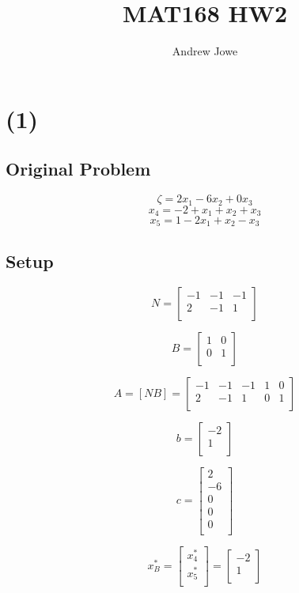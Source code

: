 \documentclass[14pt]{extarticle}
\title{MAT168 HW2}
\author{Andrew Jowe}
\begin{document}
\maketitle

\section*{(1)}
\subsection*{Original Problem}
\[
    \zeta = 2x_1 - 6x_2 + 0x_3
\]
\[
    x_4 = -2 + x_1 + x_2 + x_3
\]
\[
    x_5 = 1 - 2x_1 + x_2 - x_3
\]

\subsection*{Setup}
\[
    N=\begin{bmatrix}
        -1 & -1 & -1 \\
        2 & -1 & 1 \\
    \end{bmatrix}
\]

\[
    B=\begin{bmatrix}
        1 & 0 \\
        0 & 1 \\
    \end{bmatrix}
\]

\[
    A
    =\left[NB\right]
    =\begin{bmatrix}
        -1 & -1 & -1 & 1 & 0 \\
        2 & -1 & 1 & 0 & 1 \\
    \end{bmatrix}
\]

\[
    b=\begin{bmatrix}
        -2 \\
        1 \\
    \end{bmatrix}
\]

\[
    c=\begin{bmatrix}
        2 \\
        -6 \\
        0 \\
        0 \\
        0 \\
    \end{bmatrix}
\]

\[
    x^*_B = \begin{bmatrix}
        x^*_4 \\
        x^*_5 \\
    \end{bmatrix}
    = \begin{bmatrix}
        -2 \\
        1 \\
    \end{bmatrix}
\]
\end{document}

